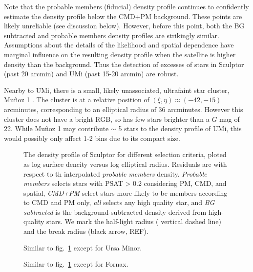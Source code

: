 Note that the probable members (fiducial) density profile continues to
confidently estimate the density profile below the CMD+PM background.
These points are likely unreliable (see discussion below). However,
before this point, both the BG subtracted and probable members density
profiles are strikingly similar. Assumptions about the details of the
likelihood and spatial dependence have marginal influence on the
resulting density profile when the satellite is higher density than the
background. Thus the detection of excesses of stars in Sculptor (past 20
arcmin) and UMi (past 15-20 arcmin) are robust.

Nearby to UMi, there is a small, likely unassociated, ultrafaint star
cluster, Muñoz 1 \citep{munoz+2012}. The cluster is at a relative
position of \((\xi, \eta) \approx(-42, -15)\) arcminutes, corresponding
to an elliptical radius of 36 arcminutes. However this cluster does not
have a bright RGB, so has few stars brighter than a \(G\) mag of 22.
While Muñoz 1 may contribute \(\sim\) 5 stars to the density profile of
UMi, this would possibly only affect 1-2 bins due to its compact size.

\begin{figure}
\centering
{}
\caption[Sculptor density profiles]{The density profile of Sculptor for
different selection criteria, ploted as log surface dencity versus log
elliptical radius. Residuals are with respect to th interpolated
\emph{probable members} density. \emph{Probable members} selects stars
with PSAT \textgreater{} 0.2 considering PM, CMD, and spatial,
\emph{CMD+PM} select stars more likely to be members according to CMD
and PM only, \emph{all} selects any high quality star, and \emph{BG
subtracted} is the background-subtracted density derived from
high-quality stars. We mark the half-light radius ( vertical dashed
line) and the break radius (black arrow,
REF).}\label{fig:scl_observed_profiles}
\end{figure}

\begin{figure}
\centering
{}
\caption[Ursa Minor density profiles]{Similar to
fig.~\ref{fig:scl_observed_profiles} except for Ursa
Minor.}\label{fig:umi_observed_profiles}
\end{figure}

\begin{figure}
\centering
{}
\caption[Fornax density profiles]{Similar to
fig.~\ref{fig:scl_observed_profiles} except for
Fornax.}\label{fig:fornax_observed_profiles}
\end{figure}

